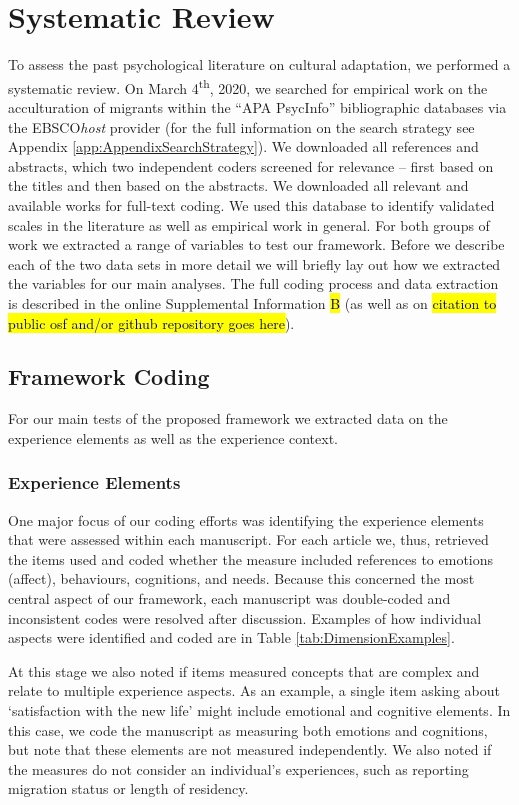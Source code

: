 \documentclass[man, 12pt, a4paper]{apa7}
\begin{document}
\section{Systematic Review}
To assess the past psychological literature on cultural adaptation, we performed a systematic review. On March 4\textsuperscript{th}, 2020, we searched for empirical work on the acculturation of migrants within the ``APA PsycInfo'' bibliographic databases via the EBSCO\textit{host} provider (for the full information on the search strategy see Appendix \ref{app:AppendixSearchStrategy}). We downloaded all references and abstracts, which two independent coders screened for relevance -- first based on the titles and then based on the abstracts. We downloaded all relevant and available works for full-text coding. We used this database to identify validated scales in the literature as well as empirical work in general. For both groups of work we extracted a range of variables to test our framework. Before we describe each of the two data sets in more detail we will briefly lay out how we extracted the variables for our main analyses. The full coding process and data extraction is described in the online Supplemental Information \hl{B} (as well as on \hl{citation to public osf and/or github repository goes here}).

\subsection{Framework Coding}
For our main tests of the proposed framework we extracted data on the experience elements as well as the experience context.
\subsubsection{Experience Elements}
One major focus of our coding efforts was identifying the experience elements that were assessed within each manuscript. For each article we, thus, retrieved the items used and coded whether the measure included references to emotions (affect), behaviours, cognitions, and needs. Because this concerned the most central aspect of our framework, each manuscript was double-coded and inconsistent codes were resolved after discussion. Examples of how individual aspects were identified and coded are in Table \ref{tab:DimensionExamples}.


At this stage we also noted if items measured concepts that are complex and relate to multiple experience aspects. As an example, a single item asking about `satisfaction with the new life' might include emotional and cognitive elements. In this case, we code the manuscript as measuring both emotions and cognitions, but note that these elements are not measured independently. We also noted if the measures do not consider an individual's experiences, such as reporting migration status or length of residency.
\end{document}
